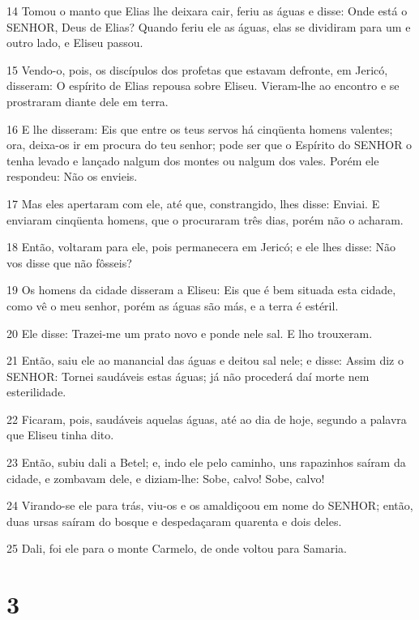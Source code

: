 \par 14 Tomou o manto que Elias lhe deixara cair, feriu as águas e disse: Onde está o SENHOR, Deus de Elias? Quando feriu ele as águas, elas se dividiram para um e outro lado, e Eliseu passou.
\par 15 Vendo-o, pois, os discípulos dos profetas que estavam defronte, em Jericó, disseram: O espírito de Elias repousa sobre Eliseu. Vieram-lhe ao encontro e se prostraram diante dele em terra.
\par 16 E lhe disseram: Eis que entre os teus servos há cinqüenta homens valentes; ora, deixa-os ir em procura do teu senhor; pode ser que o Espírito do SENHOR o tenha levado e lançado nalgum dos montes ou nalgum dos vales. Porém ele respondeu: Não os envieis.
\par 17 Mas eles apertaram com ele, até que, constrangido, lhes disse: Enviai. E enviaram cinqüenta homens, que o procuraram três dias, porém não o acharam.
\par 18 Então, voltaram para ele, pois permanecera em Jericó; e ele lhes disse: Não vos disse que não fôsseis?
\par 19 Os homens da cidade disseram a Eliseu: Eis que é bem situada esta cidade, como vê o meu senhor, porém as águas são más, e a terra é estéril.
\par 20 Ele disse: Trazei-me um prato novo e ponde nele sal. E lho trouxeram.
\par 21 Então, saiu ele ao manancial das águas e deitou sal nele; e disse: Assim diz o SENHOR: Tornei saudáveis estas águas; já não procederá daí morte nem esterilidade.
\par 22 Ficaram, pois, saudáveis aquelas águas, até ao dia de hoje, segundo a palavra que Eliseu tinha dito.
\par 23 Então, subiu dali a Betel; e, indo ele pelo caminho, uns rapazinhos saíram da cidade, e zombavam dele, e diziam-lhe: Sobe, calvo! Sobe, calvo!
\par 24 Virando-se ele para trás, viu-os e os amaldiçoou em nome do SENHOR; então, duas ursas saíram do bosque e despedaçaram quarenta e dois deles.
\par 25 Dali, foi ele para o monte Carmelo, de onde voltou para Samaria.

\chapter{3}

